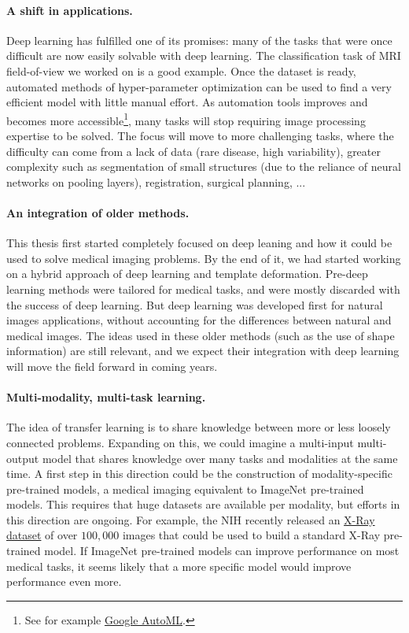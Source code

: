 \paragraph*{A shift in applications.}
Deep learning has fulfilled one of its promises: many of the tasks that were once difficult are now easily solvable with deep learning. The classification task of MRI field-of-view we worked on is a good example. Once the dataset is ready, automated methods of hyper-parameter optimization can be used to find a very efficient model with little manual effort. As automation tools improves and becomes more accessible\footnote{See for example \href{https://cloud.google.com/automl/}{Google AutoML}.}, many tasks will stop requiring image processing expertise to be solved. The focus will move to more challenging tasks, where the difficulty can come from a lack of data (rare disease, high variability), greater complexity such as segmentation of small structures (due to the reliance of neural networks on pooling layers), registration, surgical planning, ...

\paragraph*{An integration of older methods.}
This thesis first started completely focused on deep leaning and how it could be used to solve medical imaging problems. By the end of it, we had started working on a hybrid approach of deep learning and template deformation. Pre-deep learning methods were tailored for medical tasks, and were mostly discarded with the success of deep learning. But deep learning was developed first for natural images applications, without accounting for the differences between natural and medical images. The ideas used in these older methods (such as the use of shape information) are still relevant, and we expect their integration with deep learning will move the field forward in coming years.

\paragraph*{Multi-modality, multi-task learning.}
The idea of transfer learning is to share knowledge between more or less loosely connected problems. Expanding on this, we could imagine a multi-input multi-output model that shares knowledge over many tasks and modalities at the same time. A first step in this direction could be the construction of modality-specific pre-trained models, a medical imaging equivalent to ImageNet pre-trained models. This requires that huge datasets are available per modality, but efforts in this direction are ongoing. For example, the NIH recently released an \href{https://nihcc.app.box.com/v/ChestXray-NIHCC}{X-Ray dataset} of over $100,000$ images that could be used to build a standard X-Ray pre-trained model. If ImageNet pre-trained models can improve performance on most medical tasks, it seems likely that a more specific model would improve performance even more.

